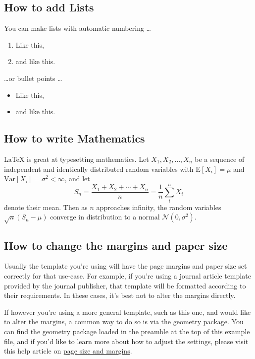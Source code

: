 \subsection{How to add Lists}

You can make lists with automatic numbering \dots

\begin{enumerate}
\item Like this,
\item and like this.
\end{enumerate}
\dots or bullet points \dots
\begin{itemize}
\item Like this,
\item and like this.
\end{itemize}

\subsection{How to write Mathematics}

\LaTeX{} is great at typesetting mathematics. Let $X_1, X_2, \ldots, X_n$ be a sequence of independent and identically distributed random variables with $\text{E}[X_i] = \mu$ and $\text{Var}[X_i] = \sigma^2 < \infty$, and let
\[S_n = \frac{X_1 + X_2 + \cdots + X_n}{n}
      = \frac{1}{n}\sum_{i}^{n} X_i\]
denote their mean. Then as $n$ approaches infinity, the random variables $\sqrt{n}(S_n - \mu)$ converge in distribution to a normal $\mathcal{N}(0, \sigma^2)$.


\subsection{How to change the margins and paper size}

Usually the template you're using will have the page margins and paper size set correctly for that use-case. For example, if you're using a journal article template provided by the journal publisher, that template will be formatted according to their requirements. In these cases, it's best not to alter the margins directly.

If however you're using a more general template, such as this one, and would like to alter the margins, a common way to do so is via the geometry package. You can find the geometry package loaded in the preamble at the top of this example file, and if you'd like to learn more about how to adjust the settings, please visit this help article on \href{https://www.overleaf.com/learn/latex/page_size_and_margins}{page size and margins}.

